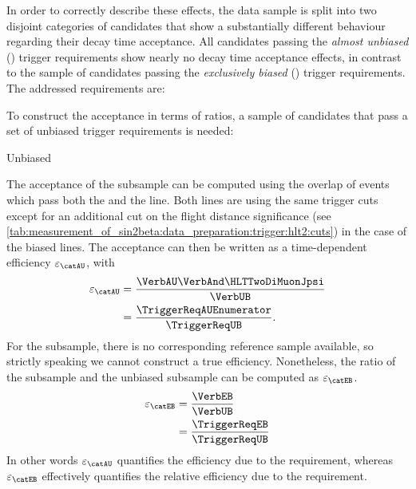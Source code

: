 In order to correctly describe these effects, the data sample is split into two
disjoint categories of candidates that show a substantially different behaviour
regarding their decay time acceptance. All candidates passing the \emph{almost
unbiased} (\textbf{\catAU}) trigger requirements show nearly no decay time
acceptance effects, in contrast to the sample of candidates passing the
\emph{exclusively biased} (\textbf{\catEB}) trigger requirements. The addressed
requirements are:
%
\begin{description}
  \item[\catAU] \TriggerReqAU
  \item[\catEB] \TriggerReqEB
\end{description}
%
To construct the acceptance in terms of ratios, a sample of candidates that pass
a set of unbiased trigger requirements is needed:
%
\begin{description}
  \item[Unbiased] \TriggerReqUB
\end{description}
%
The acceptance of the \catAU subsample can be computed using the overlap of events
which pass both the \HLTTwoDiMuonDetachedJpsi and the
\HLTTwoDiMuonJpsi line. Both lines are using the same trigger cuts except for
an additional cut on the flight distance significance (see
\cref{tab:measurement_of_sin2beta:data_preparation:trigger:hlt2:cuts}) in the
case of the biased lines. The acceptance can then be written as a time-dependent
efficiency $\varepsilon_\text{\catAU}$, with
%
\begin{equation}
  \begin{split}
    \varepsilon_\text{\catAU} &= \frac{\VerbAU \VerbAnd \HLTTwoDiMuonJpsi}{\VerbUB}\\
                              &= \frac{\TriggerReqAUEnumerator}{\TriggerReqUB}.
  \end{split}
\end{equation} 
%
For the \catEB subsample, there is no corresponding reference sample available, so
strictly speaking we cannot construct a true efficiency. Nonetheless, the ratio
of the \catEB subsample and the unbiased subsample can be computed as
$\varepsilon_\text{\catEB}$.
%
\begin{equation}
  \begin{split}
    \varepsilon_\text{\catEB} &= \frac{\VerbEB}{\VerbUB}\\
                              &= \frac{\TriggerReqEB}{\TriggerReqUB}
  \end{split}
\end{equation}
%
In other words $\varepsilon_\text{\catAU}$ quantifies the efficiency due to the
\HLTTwoDiMuonDetachedJpsi requirement, whereas $\varepsilon_\text{\catEB}$
effectively quantifies the relative efficiency due to the \HLTOneTrackMuon
requirement.

